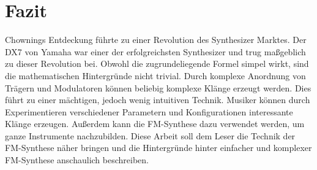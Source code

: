\section{Fazit}

Chownings Entdeckung führte zu einer Revolution des Synthesizer Marktes. Der DX7 von Yamaha war einer der erfolgreichsten Synthesizer und trug maßgeblich zu dieser Revolution bei. Obwohl die zugrundeliegende Formel simpel wirkt, sind die mathematischen Hintergründe nicht trivial. Durch komplexe Anordnung von Trägern und Modulatoren können beliebig komplexe Klänge erzeugt werden. Dies führt zu einer mächtigen, jedoch wenig intuitiven Technik. Musiker können durch Experimentieren verschiedener Parametern und Konfigurationen interessante Klänge erzeugen. Außerdem kann die FM-Synthese dazu verwendet werden, um ganze Instrumente nachzubilden.
Diese Arbeit soll dem Leser die Technik der FM-Synthese näher bringen und die Hintergründe hinter einfacher und komplexer FM-Synthese anschaulich beschreiben.